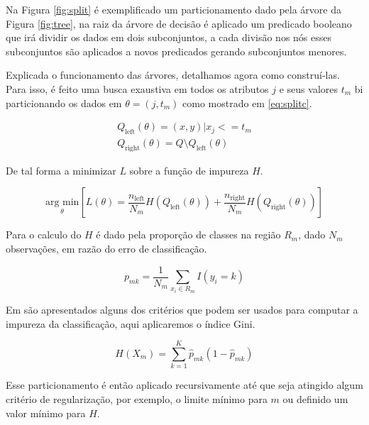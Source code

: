 Na Figura \ref{fig:split} é exemplificado um particionamento dado pela árvore
da Figura \ref{fig:tree}, na raiz da árvore de decisão é aplicado um predicado
booleano que irá dividir os dados em dois subconjuntos, a cada divisão nos nós
esses subconjuntos são aplicados a novos predicados gerando subconjuntos
menores.

Explicada o funcionamento das árvores, detalhamos agora como construí-las. Para
isso, é feito uma busca exaustiva em todos os atributos $j$ e seus valores
$t_m$ bi particionando os dados em $\theta = (j,t_m)$ como mostrado em
\ref{eq:splitc}.

\begin{equation}
        \begin{aligned}
            Q_{\text{left}}(\theta) = {(x, y) | x_j <= t_m}\\
            Q_{\text{right}}(\theta) = Q \setminus Q_{\text{left}}(\theta)
        \end{aligned}
    \label{eq:splitc}
\end{equation}

De tal forma a minimizar $L$ sobre a função de
impureza $H$.

\begin{equation}
    \underset{\theta}{\text{arg min}} \left[ L(\theta) =  \frac{n_{\text{left}}}{N_m} H(Q_{\text{left}}(\theta)) +
    \frac{n_{\text{right}}}{N_m} H(Q_{\text{right}}(\theta)) \right]
    \label{eq:treegreed}
\end{equation}

Para o calculo do $H$ é dado pela proporção de classes na região $R_m$,
dado $N_m$ observações, em razão do erro de classificação.

\begin{equation}
    p_{mk} = \frac{1}{N_m} \sum_{x_i \in R_m} I(y_i = k)
\end{equation}

Em \cite{friedman2001elements} são apresentados alguns dos critérios que podem
ser usados para computar a impureza da classificação, aqui aplicaremos o índice
Gini.

\begin{equation}
    H(X_m) = \sum_{k=1}^{K} \hat{p}_{mk}(1 - \hat{p}_{mk})
    \label{eq:gini}
\end{equation}

Esse particionamento é então aplicado recursivamente até que seja atingido
algum critério de regularização, por exemplo, o limite mínimo para $m$ ou
definido um valor mínimo para $H$.

